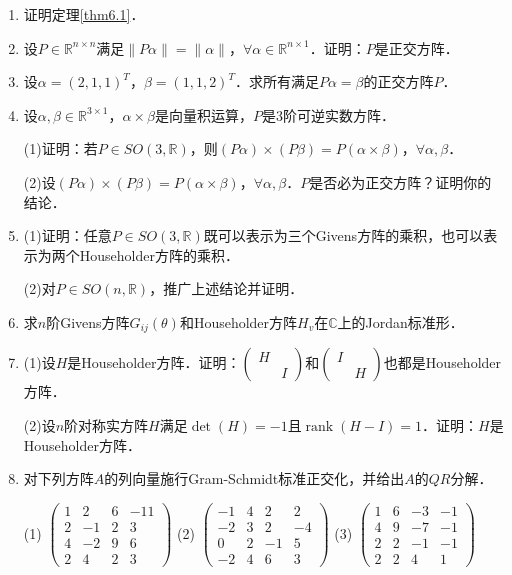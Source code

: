 \documentclass[a4paper,fontset=windows]{ctexbook}
\theoremstyle{definition}
\DeclareMathOperator{\rank}{rank}
\begin{document}
\begin{enumerate}
\item 证明定理\ref{thm6.1}．

\item 设$P\in\mathbb{R}^{n\times n}$满足$\|P\alpha\|=\|\alpha\|$，$\forall\alpha\in\mathbb{R}^{n\times 1}$．证明：$P$是正交方阵．

\item 设$\alpha=(2,1,1)^T$，$\beta=(1,1,2)^T$．求所有满足$P\alpha=\beta$的正交方阵$P$．

\item 设$\alpha,\beta\in\mathbb{R}^{3\times 1}$，$\alpha\times\beta$是向量积运算，$P$是3阶可逆实数方阵．

(1)证明：若$P\in SO(3,\mathbb{R})$，则$(P\alpha)\times(P\beta)=P(\alpha\times\beta)$，$\forall\alpha,\beta$．

(2)设$(P\alpha)\times(P\beta)=P(\alpha\times\beta)$，$\forall\alpha,\beta$．$P$是否必为正交方阵？证明你的结论．

\item (1)证明：任意$P\in SO(3,\mathbb{R})$既可以表示为三个Givens方阵的乘积，也可以表示为两个Householder方阵的乘积．

(2)对$P\in SO(n,\mathbb{R})$，推广上述结论并证明．

\item 求$n$阶Givens方阵$G_{ij}(\theta)$和Householder方阵$H_v$在$\mathbb{C}$上的Jordan标准形．

\item (1)设$H$是Householder方阵．证明：$\begin{pmatrix}H& \\ &I\end{pmatrix}$和$\begin{pmatrix}I& \\ &H\end{pmatrix}$也都是Householder方阵．

(2)设$n$阶对称实方阵$H$满足$\det(H)=-1$且$\rank(H-I)=1$．证明：$H$是Householder方阵．

\item 对下列方阵$A$的列向量施行Gram-Schmidt标准正交化，并给出$A$的$QR$分解．

(1) $\begin{pmatrix}1&2&6&-11 \\ 2&-1&2&3 \\ 4&-2&9&6 \\ 2&4&2&3\end{pmatrix}$ \qquad
(2) $\begin{pmatrix}-1&4&2&2 \\ -2&3&2&-4 \\ 0&2&-1&5 \\ -2&4&6&3\end{pmatrix}$ \qquad
(3) $\begin{pmatrix}1&6&-3&-1 \\ 4&9&-7&-1 \\ 2&2&-1&-1 \\ 2&2&4&1\end{pmatrix}$


\end{enumerate}
\end{document}
